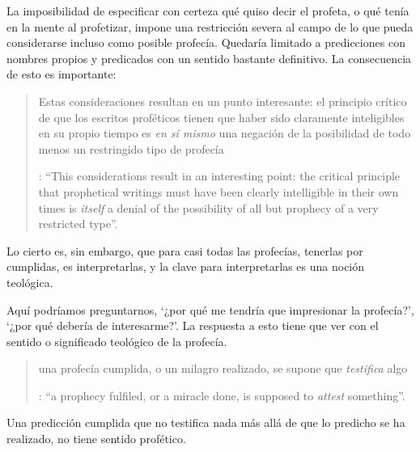 La imposibilidad de especificar con certeza qué quiso decir el profeta, o qué tenía en la mente al profetizar, impone una restricción severa al campo de lo que pueda considerarse incluso como posible profecía. Quedaría limitado a predicciones con nombres propios y predicados con un sentido bastante definitivo. La consecuencia de esto es importante: \blockquote[{\Cite[31]{anscombe2008faith:prophandmi}}: \enquote{This considerations result in an interesting point: the critical principle that prophetical writings must have been clearly intelligible in their own times is \emph{itself} a denial of the possibility of all but prophecy of a very restricted type}.]{Estas consideraciones resultan en un punto interesante: el principio crítico de que los escritos proféticos tienen que haber sido claramente inteligibles en su propio tiempo es \emph{en sí mismo} una negación de la posibilidad de todo menos un restringido tipo de profecía}. Lo cierto es, sin embargo, que para casi todas las profecías, tenerlas por cumplidas, es interpretarlas, y la clave para interpretarlas es una noción teológica.

Aquí podríamos preguntarnos, \enquote*{¿por qué me tendría que impresionar la profecía?}, \enquote*{¿por qué debería de interesarme?}. La respuesta a esto tiene que ver con el sentido o significado teológico de la profecía. \blockquote[{\Cite[32]{anscombe2008faith:prophandmi}}: \enquote{a prophecy fulfiled, or a miracle done, is supposed to \emph{attest} something}.]{una profecía cumplida, o un milagro realizado, se supone que \emph{testifica} algo}. Una predicción cumplida que no testifica nada más allá de que lo predicho se ha realizado, no tiene sentido profético.


